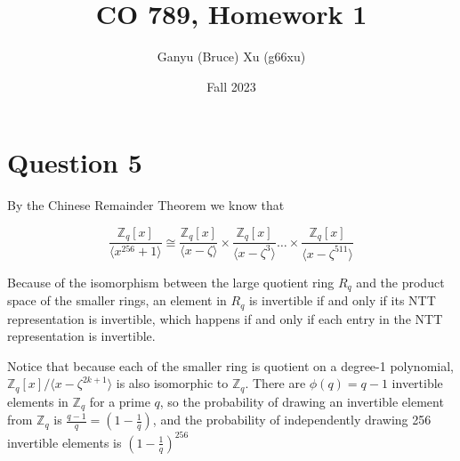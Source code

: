 \documentclass{article}
\title{CO 789, Homework 1}
\author{Ganyu (Bruce) Xu (g66xu)}
\date{Fall 2023}
\begin{document}

\section*{Question 5}
By the Chinese Remainder Theorem we know that

\begin{equation}
    \frac{\mathbb{Z}_q[x]}{\langle x^{256} + 1\rangle} \cong
    \frac{\mathbb{Z}_q[x]}{\langle x - \zeta\rangle}
    \times \frac{\mathbb{Z}_q[x]}{\langle x - \zeta^3\rangle}
    \ldots
    \times \frac{\mathbb{Z}_q[x]}{\langle x - \zeta^{511}\rangle}
\end{equation}

Because of the isomorphism between the large quotient ring $R_q$ and the product space of the smaller rings, an element in $R_q$ is invertible if and only if its NTT representation is invertible, which happens if and only if each entry in the NTT representation is invertible.

Notice that because each of the smaller ring is quotient on a degree-1 polynomial, $\mathbb{Z}_q[x] / \langle x - \zeta^{2k + 1} \rangle$ is also isomorphic to $\mathbb{Z}_q$. There are $\phi(q) = q-1$ invertible elements in $\mathbb{Z}_q$ for a prime $q$, so the probability of drawing an invertible element from $\mathbb{Z}_q$ is $\frac{q-1}{q} = (1 - \frac{1}{q})$, and the probability of independently drawing 256 invertible elements is $(1 - \frac{1}{q})^{256}$
\end{document}
